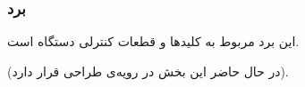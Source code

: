 \documentclass[a4paper,12pt]{report}
\begin{document}
	\pagebreak
	\subsubsection{
		برد
	}\label{subsubsec3:subsec2:sec3:chap2}
	این برد مربوط به کلید‌ها و قطعات کنترلی دستگاه است.

	\danger
	(در حال حاضر این بخش در رویه‌ی طراحی قرار دارد).

%	
%	
\end{document}
